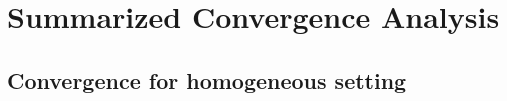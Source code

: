 \documentclass[twoside]{article}
\begin{document}
\section{Summarized Convergence Analysis}\label{sec:gen-proof}

\subsection{Convergence for homogeneous setting}\label{sec:gen-proof-hom}
\begin{table}[H]
    \centering
    \caption{Comparison of results with compression and periodic averaging in the homogeneous setting. Here, $p$ is the number of devices, $\mu$ is the PL constant, $m$ is the number of bins of hash tables, $d$ is the dimension of the model, $\kappa$ is the condition number, $\epsilon$ is the target accuracy, $R$ is the number of communication rounds, and $\tau$ is the number of local updates. UG and PP stand for Unbounded Gradient and Privacy Property respectively.}
\label{table:1}
\end{table}
\end{document}
